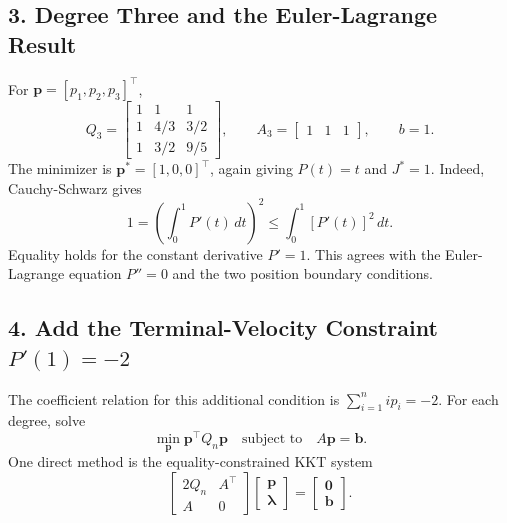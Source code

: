 \subsection{3. Degree Three and the Euler-Lagrange Result}
For $\mathbf p=[p_1,p_2,p_3]^\top$,
\begin{equation}
Q_3=\begin{bmatrix}1&1&1\\1&4/3&3/2\\1&3/2&9/5\end{bmatrix},\qquad
A_3=\begin{bmatrix}1&1&1\end{bmatrix},\qquad b=1.
\end{equation}
The minimizer is $\mathbf p^*=[1,0,0]^\top$, again giving $P(t)=t$ and $J^*=1$.
Indeed, Cauchy-Schwarz gives
\begin{equation}
1=\left(\int_0^1P'(t)\,dt\right)^2\leq\int_0^1[P'(t)]^2\,dt.
\end{equation}
Equality holds for the constant derivative $P'=1$. This agrees with the
Euler-Lagrange equation $P''=0$ and the two position boundary conditions.

\clearpage
\subsection{4. Add the Terminal-Velocity Constraint \texorpdfstring{$P'(1)=-2$}{P'(1)=-2}}
The coefficient relation for this additional condition is
$\sum_{i=1}^n i p_i=-2$. For each degree, solve
\begin{equation}
\min_{\mathbf p}\mathbf p^\top Q_n\mathbf p
\quad\text{subject to}\quad A\mathbf p=\mathbf b.
\end{equation}
One direct method is the equality-constrained KKT system
\begin{equation}
\begin{bmatrix}2Q_n&A^\top\\A&0\end{bmatrix}
\begin{bmatrix}\mathbf p\\\boldsymbol\lambda\end{bmatrix}
=\begin{bmatrix}\mathbf0\\\mathbf b\end{bmatrix}.
\end{equation}

